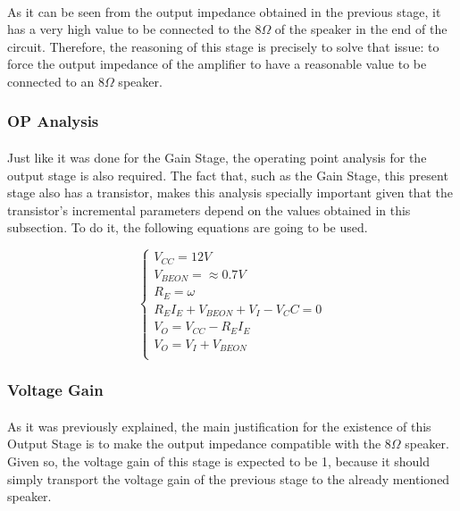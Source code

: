 \paragraph{}As it can be seen from the output impedance obtained in the previous stage, it has a very high value to be connected to the $8\Omega$ of the speaker in the end of the circuit. Therefore, the reasoning of this stage is precisely to solve that issue: to force the output impedance of the amplifier to have a reasonable value to be connected to an $8 \Omega$  speaker.


\subsubsection{OP Analysis}

\paragraph{}Just like it was done for the Gain Stage, the operating point analysis for the output stage is also required. The fact that, such as the Gain Stage, this present stage also has a transistor, makes this analysis specially important given that the transistor's incremental parameters depend on the values obtained in this subsection. To do it, the following equations are going to be used.

\[ 
\left\{\begin{matrix}
V_{CC}=12 V\\
V_{BEON}=\approx 0.7 V\\
R_E= \omega\\
R_E I_E + V_{BEON} + V_I - V_CC = 0\\
V_O = V_{CC} - R_E I_E\\
V_O=V_I + V_{BEON}\\
\end{matrix}\right.
\]

\subsubsection{Voltage Gain}

\paragraph{}As it was previously explained, the main justification for the existence of this Output Stage is to make the output impedance compatible with the $8\Omega$ speaker. Given so, the voltage gain of this stage is expected to be 1, because it should simply transport the voltage gain of the previous stage to the already mentioned speaker.

